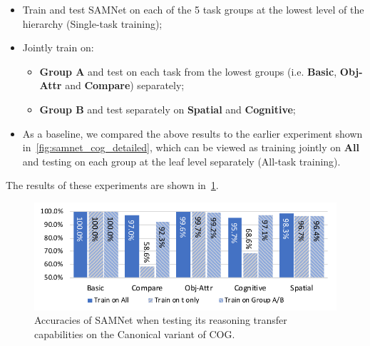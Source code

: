  \begin{itemize}
 	\compresslist
	\item Train and test SAMNet on each of the 5 task groups at the lowest level of the hierarchy (Single-task training);
	\item Jointly train on:
	\begin{itemize}
		\item \textbf{Group A} and test on each task from the lowest groups (i.e. \textbf{Basic}, \textbf{Obj-Attr} and \textbf{Compare}) separately;
		\item \textbf{Group B} and test separately on \textbf{Spatial} and \textbf{Cognitive};
	\end{itemize}
	\item As a baseline, we compared the above results to the earlier experiment shown in~\cref{fig:samnet_cog_detailed}, which can be viewed as training jointly on \textbf{All} and testing on each group at the leaf level separately (All-task training).
\end{itemize}

The results of these experiments are shown in~\cref{fig:cog_reasoning_transfer}.

\begin{figure}[htbp]
	\centering
	\includegraphics[width=\columnwidth]{../img/plots/cog_reasoning_transfer.pdf}
	\caption{Accuracies of SAMNet when testing its reasoning transfer capabilities on the Canonical variant of COG.}
	\label{fig:cog_reasoning_transfer}
\end{figure}



